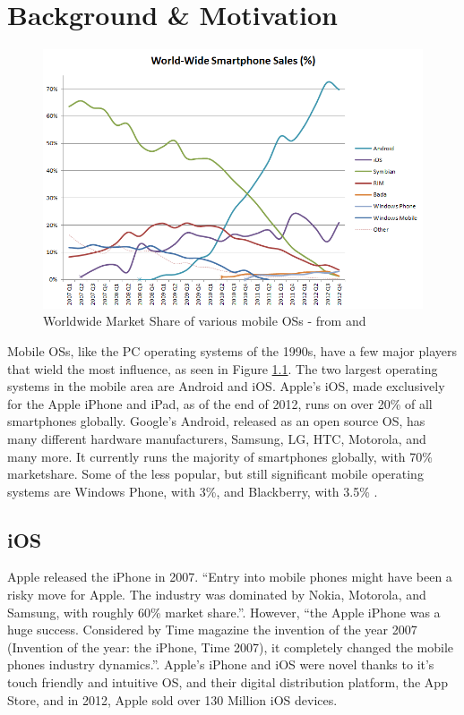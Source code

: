 \chapter{Background \& Motivation}
\label{sec:background}

\begin{figure}[h]
\begin{center}
\includegraphics[width=0.8\columnwidth]{figs/World_Wide_Smartphone_Sales_Share}
\caption{Worldwide Market Share of various mobile OSs - from \citep{wikimobileshare} and \citep{gartnerq42012}}
\label{fig:mobileshares}
\end{center}
\end{figure}


Mobile OSs, like the PC operating systems of the 1990s, have a few major players that wield the most influence, as seen in Figure \ref{fig:mobileshares}. The two largest operating systems in the mobile area are Android and iOS. Apple's iOS, made exclusively for the Apple iPhone and iPad, as of the end of 2012, runs on over 20\%\citep{gartnerq42012} of all smartphones globally. Google's Android, released as an open source OS, has many different hardware manufacturers, Samsung, LG, HTC, Motorola, and many more. It currently runs the majority of smartphones globally, with 70\%\citep{gartnerq42012}  marketshare. Some of the less popular, but still significant mobile operating systems are Windows Phone, with 3\%, and Blackberry, with 3.5\%\citep{gartnerq42012} . 

\section{iOS}
Apple released the iPhone in 2007. ``Entry into mobile phones might have been a risky move for Apple. The industry was dominated by Nokia, Motorola, and Samsung, with roughly 60\% market share.''\citep{yoffie2010apple}. However, ``the Apple iPhone was a huge success. Considered by Time magazine the invention of the year 2007 (Invention of the year: the iPhone, Time 2007), it completely changed the mobile phones industry dynamics.''\citep{reis2012leadership}. Apple's iPhone and iOS were novel thanks to it's touch friendly and intuitive OS, and their digital distribution platform, the App Store\citep{yoffie2010apple}, and in 2012, Apple sold over 130 Million iOS devices\citep{gartnerq42012}.

